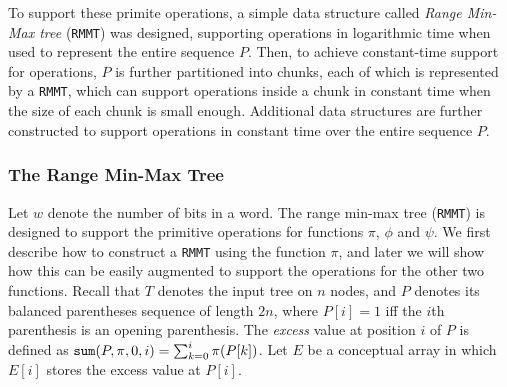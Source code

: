To support these primite operations, a simple data structure called \emph{Range Min-Max tree} ({\tt RMMT}) was designed, supporting operations in logarithmic time when used to represent the entire sequence $P$. 
Then, to achieve constant-time support for operations, $P$ is further partitioned into chunks, each of which is represented by a {\tt RMMT}, which can support operations inside a chunk in constant time when the size of each chunk is small enough. Additional data structures are further constructed to support operations in constant time over the entire sequence $P$. 

\subsubsection{The Range Min-Max Tree}

Let $w$ denote the number of bits in a word. The range min-max tree ({\tt RMMT}) is designed to support the primitive operations for functions $\pi$, $\phi$ and $\psi$. %
We first describe how to construct a {\tt RMMT} using the function $\pi$, and later we will show how this can be easily augmented to support the operations for the other two functions. 
Recall that $T$ denotes the input tree on $n$ nodes, and $P$ denotes its balanced parentheses sequence of length $2n$, where $P[i] = 1$ iff the $i$th parenthesis is an opening parenthesis. 
The {\em excess} value at position $i$ of $P$ is defined as $\mathtt{sum}(P,\pi,0,i) = \sum_{k=0}^{i} \pi(P[k])$. 
Let $E$ be a conceptual array in which $E[i]$ stores the excess value at $P[i]$. 

